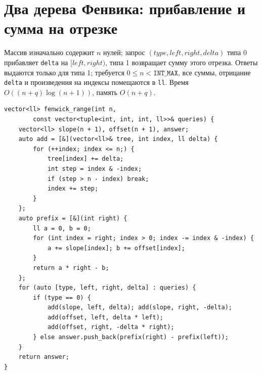 \section{Два дерева Фенвика: прибавление и сумма на отрезке}
Массив изначально содержит $n$ нулей; запрос $(type,left,right,delta)$ типа 0 прибавляет \texttt{delta} на $[left,right)$, типа 1 возвращает сумму этого отрезка.
Ответы выдаются только для типа 1; требуется $0\le n<\texttt{INT\_MAX}$, все суммы, отрицание \texttt{delta} и произведения на индексы помещаются в \texttt{ll}.
Время $O((n+q)\log(n+1))$, память $O(n+q)$.
\begin{lstlisting}[name=fenwick_range]
vector<ll> fenwick_range(int n,
        const vector<tuple<int, int, int, ll>>& queries) {
    vector<ll> slope(n + 1), offset(n + 1), answer;
    auto add = [&](vector<ll>& tree, int index, ll delta) {
        for (++index; index <= n;) {
            tree[index] += delta;
            int step = index & -index;
            if (step > n - index) break;
            index += step;
        }
    };
    auto prefix = [&](int right) {
        ll a = 0, b = 0;
        for (int index = right; index > 0; index -= index & -index) {
            a += slope[index]; b += offset[index];
        }
        return a * right - b;
    };
    for (auto [type, left, right, delta] : queries) {
        if (type == 0) {
            add(slope, left, delta); add(slope, right, -delta);
            add(offset, left, delta * left);
            add(offset, right, -delta * right);
        } else answer.push_back(prefix(right) - prefix(left));
    }
    return answer;
}
\end{lstlisting}
%

